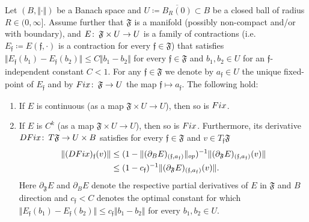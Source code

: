 \documentclass[10pt,a4paper]{amsart}
\newcommand{\col}{\colon \thinspace}
\begin{document}
\begin{lemma}\label{lem: fixed-points of families}
Let $(B,\Vert \cdot \Vert)$ be a Banach space and $U \coloneqq \overline{B_R(0)}\subset B$ be a closed ball of radius $R\in (0,\infty]$. Assume further that $\mathfrak{F}$ is a manifold (possibly non-compact and/or with boundary), and $E \col \mathfrak{F} \times U \to U$ is a family of contractions (i.e. $E_{\mathfrak{f}} \coloneqq E(\mathfrak{f},\cdot)$ is a contraction for every $\mathfrak{f} \in \mathfrak{F}$) that satisfies $\Vert E_{\mathfrak{f}}(b_1) - E_{\mathfrak{f}}(b_2) \Vert \leq C \Vert b_1 - b_2 \Vert$ for every $\mathfrak{f}\in \mathfrak{F}$ and $b_1,b_2\in U$ for an $\mathfrak{f}$-independent constant $C<1$. For any $\mathfrak{f}\in \mathfrak{F}$ we denote by $a_{\mathfrak{f}}\in U$ the unique fixed-point of $E_{\mathfrak{f}}$ and by $\textup{Fix}\col \mathfrak{F} \to U$ the map $\mathfrak{f} \mapsto a_{\mathfrak{f}}$. The following hold:
\begin{enumerate}
\item If $E$ is continuous (as a map $\mathfrak{F} \times U \to U$), then so is $\textup{Fix}$.
\item If $E$ is $C^k$ (as a map $\mathfrak{F} \times U \to U$), then so is $\textup{Fix}$. Furthermore, its derivative $D\textup{Fix} \col T \mathfrak{F} \to U\times B$ satisfies for every $\mathfrak{f}\in \mathfrak{F}$ and $v\in T_\mathfrak{f}\mathfrak{F}$ 
\begin{align*}
\Vert (D \textup{Fix})_\mathfrak{f}(v) \Vert &\leq (1- \Vert (\partial_BE)_{(\mathfrak{f},a_\mathfrak{f})} \Vert_{\textup{op}})^{-1} \Vert (\partial_{\mathfrak{F}} E)_{(\mathfrak{f},a_\mathfrak{f})}(v) \Vert \\
& \leq  (1- c_\mathfrak{f})^{-1} \Vert (\partial_{\mathfrak{F}} E)_{(\mathfrak{f},a_\mathfrak{f})}(v) \Vert.
\end{align*} 
Here $\partial_{\mathfrak{F}}E$ and $\partial_BE$ denote the respective partial derivatives of $E$ in $\mathfrak{F}$ and $B$ direction and $c_\mathfrak{f}<C$ denotes the optimal constant for which $ \Vert E_\mathfrak{f}(b_1) -E_\mathfrak{f}(b_2) \Vert \leq c_\mathfrak{f} \Vert b_1 - b_2 \Vert$ for every $b_1,b_2 \in U$.
\end{enumerate}
\end{lemma}
\end{document}
